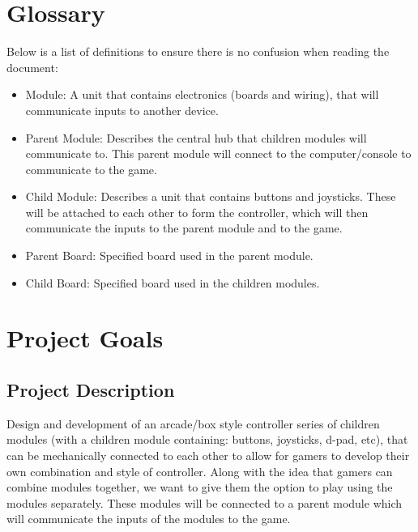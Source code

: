 \documentclass[a4]{article}
\begin{document}
\section{Glossary}
Below is a list of definitions to ensure there is no confusion when reading the document:
\begin{itemize}
    \item \textcolor{McMasterMaroon}{Module}: A unit that contains electronics (boards and wiring), that will communicate inputs to another device.
    \item \textcolor{McMasterMaroon}{Parent Module}: Describes the central hub that children modules will communicate to. This parent module will connect to the computer/console to communicate to the game.
    \item \textcolor{McMasterMaroon}{Child Module}: Describes a unit that contains buttons and joysticks. These will be attached to each other to form the controller, which will then communicate the inputs to the parent module and to the game.
    \item \textcolor{McMasterMaroon}{Parent Board}: Specified board used in the parent module.
    \item \textcolor{McMasterMaroon}{Child Board}: Specified board used in the children modules.
\end{itemize}
\section{Project Goals}
\subsection{Project Description}
Design and development of an arcade/box style controller series of children modules (with a children module containing: buttons, joysticks, d-pad, etc), that can be mechanically 
connected to each other to allow for gamers to develop their own combination and style of controller. Along with the idea that gamers can combine modules together,
we want to give them the option to play using the modules separately. These modules will be connected to a parent module which will communicate the inputs of the
modules to the game.
\end{document}
